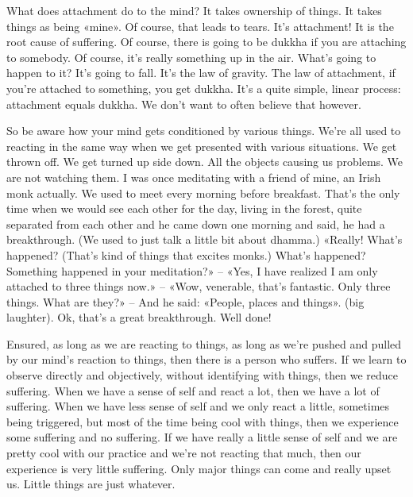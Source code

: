 \documentclass[letterpaper,10pt,english]{sphinxmanual}
\begin{document}
\sphinxAtStartPar
What does attachment do to the mind? It takes ownership of things. It
takes things as being «mine». Of course, that leads to tears. It’s attachment!
It  is  the  root  cause  of  suffering.  Of  course,  there  is  going  to  be  dukkha  if
you  are  attaching  to  somebody.  Of  course,  it’s  really  something  up  in  the
air. What’s going to happen to it? It’s going to fall. It’s the law of gravity.
The law of attachment, if you’re attached to something, you get dukkha. It’s
a quite simple, linear process: attachment equals dukkha. We don’t want to
often believe that however.

\sphinxAtStartPar
So be aware how your mind gets conditioned by various things. We’re
all  used  to  reacting  in  the  same  way  when  we  get  presented  with  various
situations. We get thrown off. We get turned up side down. All the objects
causing us problems. We are not watching them. I was once meditating with
a  friend  of  mine,  an  Irish  monk  actually. We  used  to  meet  every  morning
before  breakfast.  That’s  the  only  time  when  we  would  see  each  other  for
the  day,  living  in  the  forest,  quite  separated  from  each  other  and  he  came
down one morning and said, he had a breakthrough. (We used to just talk a
little bit about dhamma.) «Really! What’s happened? (That’s kind of things
  that excites monks.) What’s happened? Something happened in your meditation?»  –  «Yes,  I  have  realized  I  am  only  attached  to  three  things  now.»
–  «Wow,  venerable,  that’s  fantastic.  Only  three  things. What  are  they?»  –
And he said: «People, places and things». (big laughter). Ok, that’s a great
breakthrough. Well done!

\sphinxAtStartPar
Ensured, as long as we are reacting to things, as long as we’re pushed
and pulled by our mind’s reaction to things, then there is a person who suffers. If we learn to observe directly and objectively, without identifying with
things, then we reduce suffering. When we have a sense of self and react a
lot, then we have a lot of suffering. When we have less sense of self and we
only react a little, sometimes being triggered, but most of the time being cool
with things, then we experience some suffering and no suffering. If we have
really a little sense of self and we are pretty cool with our practice and we’re
not  reacting  that  much,  then  our  experience  is  very  little  suffering.  Only
major things can come and really upset us. Little things are just whatever.
\end{document}
